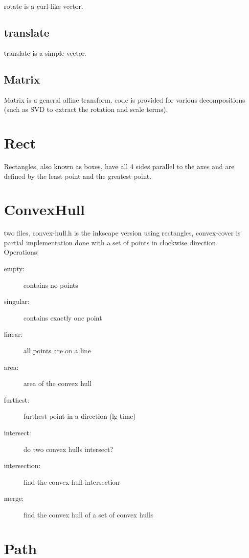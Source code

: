 rotate is a curl-like vector.

\subsection{translate}

translate is a simple vector.

\subsection{Matrix}

Matrix is a general affine transform.  code is provided for various
decompositions (such as SVD to extract the rotation and scale terms).

\section{Rect}

Rectangles, also known as boxes, have all 4 sides parallel to the axes
and are defined by the least point and the greatest point.

\section{ConvexHull}

two files, convex-hull.h is the inkscape version using rectangles,
convex-cover is partial implementation done with a set of points in
clockwise direction.  Operations:

\begin{description}
\item[empty:] contains no points
\item[singular:] contains exactly one point
\item[linear:] all points are on a line
\item[area:] area of the convex hull
\item[furthest:] furthest point in a direction (lg time)
\item[intersect:] do two convex hulls intersect?
\item[intersection:] find the convex hull intersection
\item[merge:] find the convex hull of a set of convex hulls
\end{description}

\section{Path}

